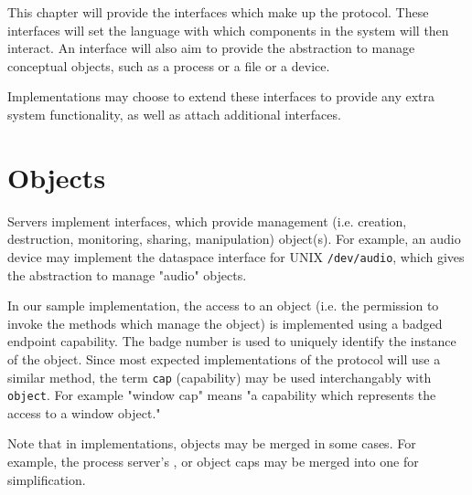 %
%
%
%

This chapter will provide the interfaces which make up the  protocol. These interfaces will
set the language with which components in the system will then interact. An interface will also aim
to provide the abstraction to manage conceptual objects, such as a process or a file or a device.

Implementations may choose to extend these interfaces to provide any extra system functionality, as
well as attach additional interfaces.

\section{Objects}

Servers implement interfaces, which provide management (i.e. creation,
destruction, monitoring, sharing, manipulation) object(s). For example, an
audio device may implement the dataspace interface for UNIX \texttt{/dev/audio},
which gives the abstraction to manage "audio" objects.

In our sample implementation, the access to an object (i.e. the permission to
invoke the methods which manage the object) is implemented using a badged
endpoint capability. The badge number is used to uniquely identify the instance
of the object. Since most expected implementations of the  protocol will
use a similar method, the term \texttt{cap} (capability) may be used
interchangably with \texttt{object}. For example "window cap" means "a
capability which represents the access to a window object."

Note that in implementations, objects may be merged in some cases. For example, the process
server's ,  or  object caps may be merged into one for
simplification.


